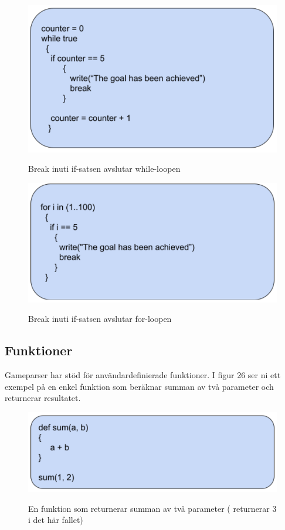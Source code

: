 \documentclass{Dokumentmall}
\begin{document}
\begin{figure}[h!]
  \centering
  \includegraphics[scale = 0.65]{Images/Figur24.png}
  \label{}
  \caption{Break inuti if-satsen avslutar while-loopen}
\end{figure}

\begin{figure}[h!]
  \centering
  \includegraphics[scale = 0.65]{Images/Figur25.png}
  \label{}
  \caption{Break inuti if-satsen avslutar for-loopen}
\end{figure}

\newpage
\subsection{Funktioner}
Gameparser har stöd för användardefinierade funktioner. I figur 26 ser ni ett exempel på en enkel funktion som beräknar summan av två parameter och returnerar resultatet.
\begin{figure}[h!]
  \centering
  \includegraphics[scale = 0.65]{Images/Figur26.png}
  \label{}
  \caption{En funktion som returnerar summan av två parameter ( returnerar 3 i det här fallet)}
\end{figure}
\end{document}
